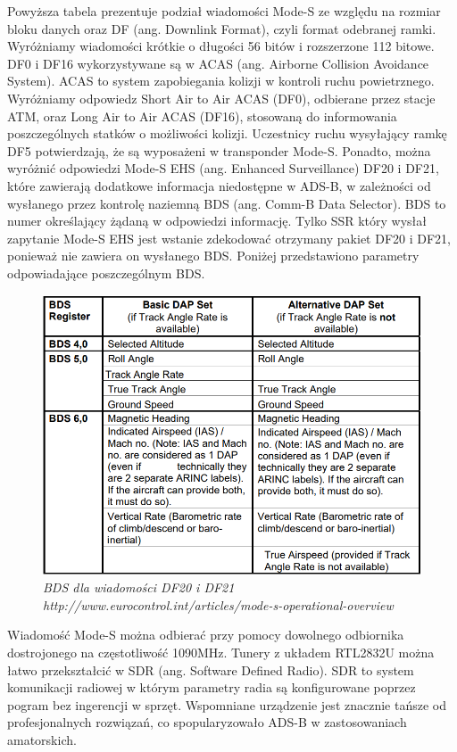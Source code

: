 \documentclass[eng,printmode]{mgr}
\begin{document}
Powyższa tabela prezentuje podział wiadomości Mode-S ze względu na rozmiar bloku danych oraz DF (ang. Downlink Format), czyli format odebranej ramki. Wyróżniamy wiadomości krótkie o długości 56 bitów i rozszerzone 112 bitowe. DF0 i DF16 wykorzystywane są w ACAS (ang. Airborne Collision Avoidance System). ACAS to system zapobiegania kolizji w kontroli ruchu powietrznego. Wyróżniamy odpowiedz Short Air to Air ACAS (DF0), odbierane przez stacje ATM, oraz Long Air to Air ACAS (DF16), stosowaną do informowania poszczególnych statków o możliwości kolizji. Uczestnicy ruchu wysyłający ramkę DF5 potwierdzają, że są wyposażeni w transponder Mode-S. Ponadto, można wyróżnić odpowiedzi Mode-S EHS (ang. Enhanced Surveillance) DF20 i DF21, które zawierają dodatkowe informacja niedostępne w ADS-B, w zależności od wysłanego przez kontrolę naziemną BDS (ang. Comm-B Data Selector). BDS to numer określający żądaną w odpowiedzi informację. Tylko SSR który wysłał zapytanie Mode-S EHS jest wstanie zdekodować otrzymany pakiet DF20 i DF21, ponieważ nie zawiera on wysłanego BDS. Poniżej przedstawiono parametry odpowiadające poszczególnym BDS.
\begin{figure}[ph]
  \centering
  \includegraphics[width=\textwidth]{images/bds.png}
  \caption{\textit{ BDS dla wiadomości DF20 i DF21 \\http://www.eurocontrol.int/articles/mode-s-operational-overview}}
\end{figure}

Wiadomość Mode-S można odbierać przy pomocy dowolnego odbiornika dostrojonego na częstotliwość 1090MHz. Tunery z układem RTL2832U można łatwo przekształcić w SDR (ang. Software Defined Radio).  SDR to system komunikacji radiowej w którym parametry radia są konfigurowane poprzez pogram bez ingerencji w sprzęt. Wspomniane urządzenie jest znacznie tańsze od profesjonalnych rozwiązań, co spopularyzowało ADS-B w zastosowaniach amatorskich. 
\end{document}
